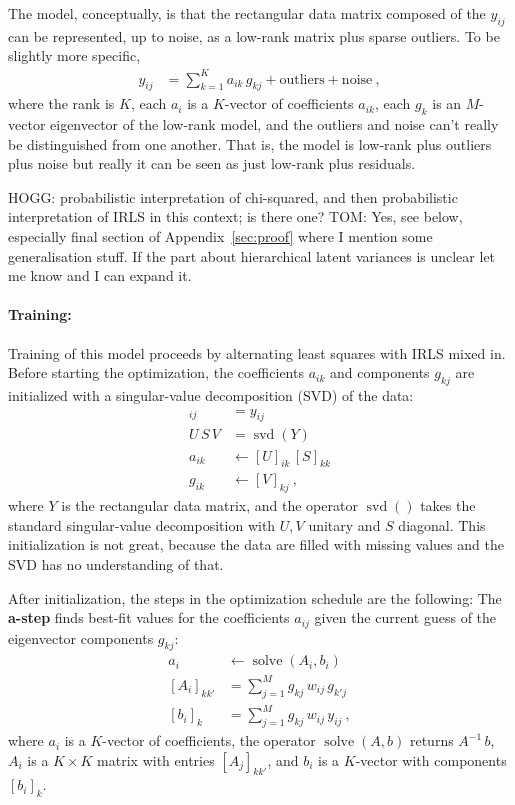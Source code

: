 \documentclass{article}
\DeclareMathOperator{\solve}{solve}
\DeclareMathOperator{\svd}{svd}
\begin{document}
The model, conceptually, is that the rectangular data matrix composed of the $y_{ij}$ can be represented, up to noise, as a low-rank matrix plus sparse outliers.
To be slightly more specific,
\begin{align}
    y_{ij} &= \sum_{k=1}^K a_{ik}\,g_{kj} + \text{outliers} + \text{noise} \label{eq:model}~,
\end{align}
where the rank is $K$,
each $a_i$ is a $K$-vector of coefficients $a_{ik}$,
each $g_k$ is an $M$-vector eigenvector of the low-rank model,
and the outliers and noise can't really be distinguished from one another.
That is, the model is low-rank plus outliers plus noise but really it can be seen as just low-rank plus residuals.

HOGG: probabilistic interpretation of chi-squared, and then probabilistic interpretation of IRLS in this context; is there one?
TOM: Yes, see below, especially final section of Appendix~\ref{sec:proof} where I mention some generalisation stuff. If the part about hierarchical latent variances is unclear let me know and I can expand it.

\paragraph{Training:}
Training of this model proceeds by alternating least squares with IRLS mixed in.
Before starting the optimization, the coefficients $a_{ik}$ and components $g_{kj}$ are initialized with a singular-value decomposition (SVD) of the data:
\begin{align}
    [Y]_{ij} &= y_{ij} \\
    U\,S\,V &= \svd(Y) \\
    a_{ik} &\leftarrow [U]_{ik}\,[S]_{kk} \\
    g_{ik} &\leftarrow [V]_{kj} ~,
\end{align}
where $Y$ is the rectangular data matrix,
and the operator $\svd()$ takes the standard singular-value decomposition with $U, V$ unitary and $S$ diagonal.
This initialization is not great, because the data are filled with missing values and the SVD has no understanding of that.

After initialization, the steps in the optimization schedule are the following:
The \textbf{a-step} finds best-fit values for the coefficients $a_{ij}$ given the current guess of the eigenvector components $g_{kj}$:
\begin{align}
    a_i &\leftarrow \solve(A_i, b_i) \label{eq:a-step} \\
    [A_i]_{kk'} &= \sum_{j=1}^M g_{kj}\,w_{ij}\,g_{k'j} \\
    [b_i]_k     &= \sum_{j=1}^M g_{kj}\,w_{ij}\,y_{ij} ~,
\end{align}
where $a_i$ is a $K$-vector of coefficients,
the operator $\solve(A, b)$ returns $A^{-1}\,b$,
$A_i$ is a $K\times K$ matrix with entries $[A_j]_{kk'}$,
and $b_i$ is a $K$-vector with components $[b_i]_k$.
\end{document}
